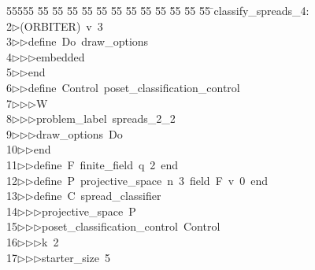 %
%
\begin{tabbing}
55555 \= 55 \= 55 \= 55 \= 55 \= 55 \= 55 \= 55 \= 55 \= 55 \= 55 \= 55 \= 55 \= \>classify\_spreads\_4:\\[0pt]
2\>$\triangleright$\>(ORBITER)\ v\ 3\ \\[0pt]
3\>$\triangleright$\>$\triangleright$\>define\ Do\ draw\_options\ \\[0pt]
4\>$\triangleright$\>$\triangleright$\>$\triangleright$\>embedded\ \\[0pt]
5\>$\triangleright$\>$\triangleright$\>end\ \\[0pt]
6\>$\triangleright$\>$\triangleright$\>define\ Control\ poset\_classification\_control\ \\[0pt]
7\>$\triangleright$\>$\triangleright$\>$\triangleright$\>W\ \\[0pt]
8\>$\triangleright$\>$\triangleright$\>$\triangleright$\>problem\_label\ spreads\_2\_2\ \\[0pt]
9\>$\triangleright$\>$\triangleright$\>$\triangleright$\>draw\_options\ Do\ \\[0pt]
10\>$\triangleright$\>$\triangleright$\>end\ \\[0pt]
11\>$\triangleright$\>$\triangleright$\>define\ F\ finite\_field\ q\ 2\ end\ \\[0pt]
12\>$\triangleright$\>$\triangleright$\>define\ P\ projective\_space\ n\ 3\ field\ F\ v\ 0\ end\ \\[0pt]
13\>$\triangleright$\>$\triangleright$\>define\ C\ spread\_classifier\ \\[0pt]
14\>$\triangleright$\>$\triangleright$\>$\triangleright$\>projective\_space\ P\ \\[0pt]
15\>$\triangleright$\>$\triangleright$\>$\triangleright$\>poset\_classification\_control\ Control\ \\[0pt]
16\>$\triangleright$\>$\triangleright$\>$\triangleright$\>k\ 2\ \\[0pt]
17\>$\triangleright$\>$\triangleright$\>$\triangleright$\>starter\_size\ 5\ \\[0pt]

\end{tabbing}
